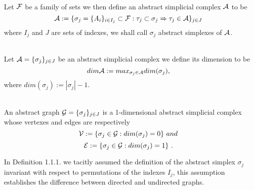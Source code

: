 \documentclass[../1.tex]{subfiles}
\begin{document}
    \begin{defn}
        \\
	Let $\mathcal{F}$ be a family of sets we then define an abstract simplicial complex $\mathcal{A}$ to be 
	\[\mathcal{A}:=\{\sigma_j=\{A_i\}_{i \in I_j} \subset \mathcal{F}: \tau_j \subset \sigma_j \Rightarrow \tau_j \in \mathcal{A}\}_{j \in J}\] 
	where $I_j$ and $J$ are sets of indexes, we shall call $\sigma_j$ abstract simplexes of $\mathcal{A}$.
    \end{defn}
    \begin{defn}
        \\
	Let $\mathcal{A} = \{\sigma_j\}_{j \in J}$ be an abstract simplicial complex we define its dimension to be
	\[ dim \mathcal{A} := max_{\sigma_j \in \mathcal{A}}dim(\sigma_j), \]
	where $dim(\sigma_j) := |\sigma_j|-1$.
    \end{defn}
    \begin{defn}
        \\
	An abstract graph $\mathcal{G} = \{\sigma_j\}_{j \in J}$ is a 1-dimensional abstract simplicial complex whose 
	vertexes and edges are respectively
	\[ \mathcal{V} := \{ \sigma_j \in \mathcal{G} : dim(\sigma_j) = 0\} \ and \]
	\[ \mathcal{E} := \{ \sigma_j \in \mathcal{G} : dim(\sigma_j) = 1\} \ .\]
    \end{defn}
    In Definition 1.1.1. we tacitly assumed the definition of the abstract simplex $\sigma_j$ invariant
    with respect to permutations of the indexes $I_j$, this assumption establishes the difference between
    directed and undirected graphs.
\end{document}
